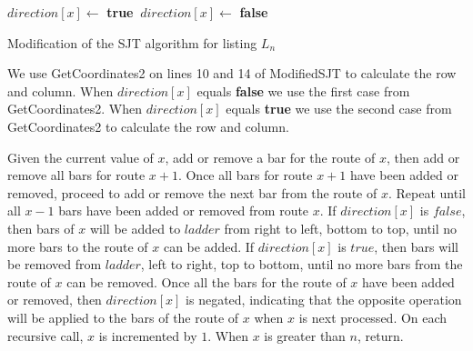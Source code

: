 {\begin{algorithm}
\begin{algorithmic}[1]
      \EndFor
       $direction[x] \gets$ \textbf{true}
      \Else $\: direction[x] \gets$ \textbf{false}
      \EndIf
    \EndFunction
  \end{algorithmic}
  \caption{Modification of the {\sc SJT} algorithm for listing $L_{n}$}
  \label{Alg:ModSJT}
\end{algorithm}


\pagebreak

We use {\sc GetCoordinates2} on lines 10 and 14 of {\sc ModifiedSJT} to calculate the row and column. 
When $direction[x]$ equals \textbf{false} we use the first case from 
{\sc GetCoordinates2}. When $direction[x]$ equals \textbf{true} we use the second case from 
{\sc GetCoordinates2} to calculate the row and column.\par 

Given the current value of $x$, add or remove a bar for the route of $x$, then add or remove 
all bars for route $x+1$. Once all bars for route $x+1$ have been added or removed, 
proceed to add or remove the next bar from the route of $x$. Repeat until all $x-1$ bars have been added or removed from route $x$.
If $direction[x]$ is $false$, then bars of $x$ will be added to 
$ladder$ from right to left, bottom to top, until no more bars to the route of $x$ can be added.
If $direction[x]$ is $true$, then bars will be removed from $ladder$, left to right, top to bottom, until 
no more bars from the route of $x$ can be removed. Once all the bars for the route of $x$ have 
been added or removed, then $direction[x]$ is negated,
indicating that the opposite operation will be applied to the bars of the route of $x$ when 
$x$ is next processed. On each recursive call, $x$ is 
incremented by $1$. When $x$ is greater than $n$, return. 

}
